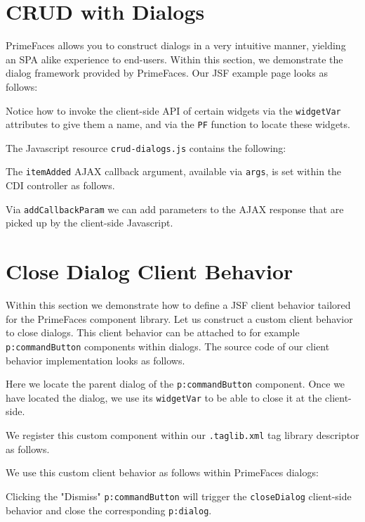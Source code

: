 \section{CRUD with Dialogs}
PrimeFaces allows you to construct dialogs in a very intuitive manner, yielding an SPA alike experience to end-users.
Within this section, we demonstrate the dialog framework provided by PrimeFaces.
Our JSF example page looks as follows:

Notice how to invoke the client-side API of certain widgets via the \texttt{widgetVar} attributes to give them a name, and via the \texttt{PF} function to locate these widgets.

The Javascript resource \texttt{crud-dialogs.js} contains the following:

The \texttt{itemAdded} AJAX callback argument, available via \texttt{args}, is set within the CDI controller as follows.


Via \texttt{addCallbackParam} we can add parameters to the AJAX response that are picked up by the client-side Javascript.

\section{Close Dialog Client Behavior}
Within this section we demonstrate how to define a JSF client behavior tailored for the PrimeFaces component library.
Let us construct a custom client behavior to close dialogs.
This client behavior can be attached to for example \texttt{p:commandButton} components within dialogs.
The source code of our client behavior implementation looks as follows.

Here we locate the parent dialog of the \texttt{p:commandButton} component.
Once we have located the dialog, we use its \texttt{widgetVar} to be able to close it at the client-side.

We register this custom component within our \texttt{.taglib.xml} tag library descriptor as follows.


We use this custom client behavior as follows within PrimeFaces dialogs:

Clicking the "Dismiss" \texttt{p:commandButton} will trigger the \texttt{closeDialog} client-side behavior and close the corresponding \texttt{p:dialog}.

